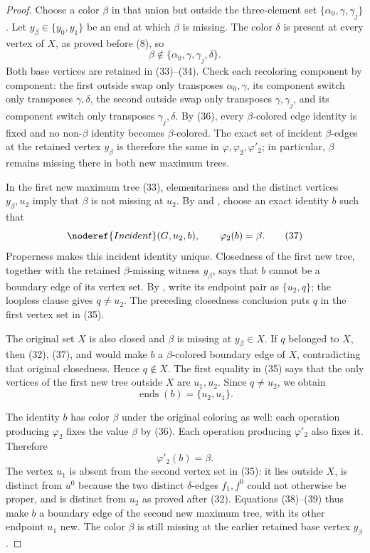 \begin{proof}
Choose a color $\beta$ in that union but outside the three-element set
$\{\alpha _0,\gamma,\gamma_j\}$.  Let $y_\beta\in\{y_0,y_1\}$ be an end
at which $\beta$ is missing.  The color $\delta$ is present at every
vertex of $X$, as proved before (8), so
\[
 \beta\notin\{\alpha _0,\gamma,\gamma_j,\delta\}.            \tag{36}
\]
Both base vertices are retained in (33)--(34).  Check each recoloring
component by component: the first outside swap only transposes
$\alpha _0,\gamma$, its component switch only transposes
$\gamma,\delta$, the second outside swap only transposes
$\gamma,\gamma_j$, and its component switch only transposes
$\gamma_j,\delta$.  By (36), every $\beta$-colored edge identity is fixed
and no non-$\beta$ identity becomes $\beta$-colored.  The exact set of
incident $\beta$-edges at the retained vertex $y_\beta$ is therefore the
same in $\varphi,\varphi_2,\varphi'_2$; in particular, $\beta$ remains
missing there in both new maximum trees.

In the first new maximum tree (33), elementariness and the distinct
vertices $y_\beta,u_2$ imply that $\beta$ is not missing at $u_2$.
By  and , choose an exact
identity $b$ such that
\[
 \noderef{Incident}(G,u_2,b),\qquad \varphi_2(b)=\beta.       \tag{37}
\]
Properness makes this incident identity unique.  Closedness of the first
new tree, together with the retained $\beta$-missing witness
$y_\beta$, says that $b$ cannot be a boundary edge of its vertex set.
By , write its endpoint pair as $\{u_2,q\}$; the
loopless clause gives $q\ne u_2$.  The preceding closedness conclusion
puts $q$ in the first vertex set in (35).

The original set $X$ is also closed and $\beta$ is missing at
$y_\beta\in X$.  If $q$ belonged to $X$, then (32), (37), and
 would make $b$ a $\beta$-colored boundary edge of
$X$, contradicting that original closedness.  Hence $q\notin X$.
The first equality in (35) says that the only vertices of the first new
tree outside $X$ are $u_1,u_2$.  Since $q\ne u_2$, we obtain
\[
 \operatorname{ends}(b)=\{u_2,u_1\}.                         \tag{38}
\]

The identity $b$ has color $\beta$ under the original coloring as well:
each operation producing $\varphi_2$ fixes the value $\beta$ by (36).
Each operation producing $\varphi'_2$ also fixes it.  Therefore
\[
 \varphi'_2(b)=\beta.                                       \tag{39}
\]
The vertex $u_1$ is absent from the second vertex set in (35): it lies
outside $X$, is distinct from $u^0$ because the two distinct
$\delta$-edges $f_1,f^0$ could not otherwise be proper, and is distinct
from $u_2$ as proved after (32).  Equations (38)--(39) thus make $b$ a
boundary edge of the second new maximum tree, with its other endpoint
$u_1$ new.  The color $\beta$ is still missing at the earlier retained
base vertex $y_\beta$.


\end{proof}
